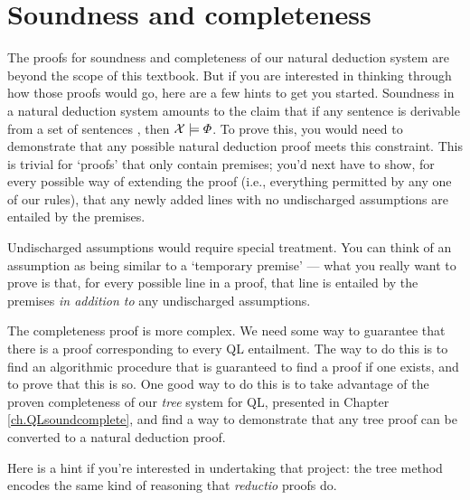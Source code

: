 


\section{Soundness and completeness}

The proofs for soundness and completeness of our natural deduction system are beyond the scope of this textbook. But if you are interested in thinking through how those proofs would go, here are a few hints to get you started. Soundness in a natural deduction system amounts to the claim that if any sentence \metaA{} is derivable from a set of sentences \metaSetX{}, then $\mathcal{X}{}\models\varPhi{}$. To prove this, you would need to demonstrate that any possible natural deduction proof meets this constraint. This is trivial for `proofs' that only contain premises; you'd next have to show, for every possible way of extending the proof (i.e., everything permitted by any one of our rules), that any newly added lines with no undischarged assumptions are entailed by the premises.

Undischarged assumptions would require special treatment. You can think of an assumption as being similar to a `temporary premise' --- what you really want to prove is that, for every possible line in a proof, that line is entailed by the premises \emph{in addition to} any undischarged assumptions.

The completeness proof is more complex. We need some way to guarantee that there is a proof corresponding to every QL entailment. The way to do this is to find an algorithmic procedure that is guaranteed to find a proof if one exists, and to prove that this is so. One good way to do this is to take advantage of the proven completeness of our \emph{tree} system for QL, presented in Chapter \ref{ch.QLsoundcomplete}, and find a way to demonstrate that any tree proof can be converted to a natural deduction proof.

Here is a hint if you're interested in undertaking that project: the tree method encodes the same kind of reasoning that \emph{reductio} proofs do.

\practiceproblems

